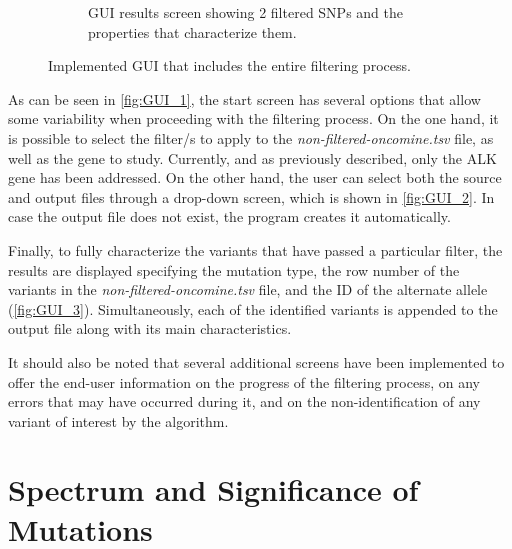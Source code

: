 \begin{figure}[ht]
\begin{subfigure}{0.52\textwidth}
        \caption{GUI results screen showing 2 filtered SNPs and the properties that characterize them.}
        \label{fig:GUI_3}
    \end{subfigure}
    \hfill
    \caption{Implemented GUI that includes the entire filtering process.}
    \label{fig:GUI}
\end{figure}

As can be seen in \autoref{fig:GUI_1}, the start screen has several options that allow some variability when proceeding with the filtering process. On the one hand, it is possible to select the filter\slash s to apply to the \textit{non-filtered-oncomine.tsv} file, as well as the gene to study. Currently, and as previously described, only the ALK gene has been addressed. On the other hand, the user can select both the source and output files through a drop-down screen, which is shown in \autoref{fig:GUI_2}. In case the output file does not exist, the program creates it automatically.

Finally, to fully characterize the variants that have passed a particular filter, the results are displayed specifying the mutation type, the row number of the variants in the \textit{non-filtered-oncomine.tsv} file, and the ID of the alternate allele (\autoref{fig:GUI_3}). Simultaneously, each of the identified variants is appended to the output file along with its main characteristics.

It should also be noted that several additional screens have been implemented to offer the end-user information on the progress of the filtering process, on any errors that may have occurred during it, and on the non-identification of any variant of interest by the algorithm.

\section{Spectrum and Significance of Mutations}





